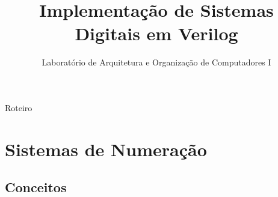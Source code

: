 

\title{Implementação de Sistemas Digitais em Verilog}

\subtitle{Laboratório de Arquitetura e Organização de Computadores I} %



\begin{frame}
	\titlepage
\end{frame} 

\begin{frame}{Roteiro}
  \tableofcontents
\end{frame}


\section{Sistemas de Numeração}

\subsection{Conceitos} 


